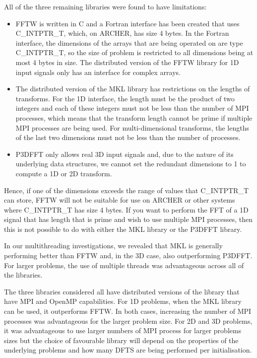 \documentclass[a4paper]{article}
\begin{document}
All of the three remaining libraries were found to have limitations:
\begin{itemize}
\item FFTW is written in C and a Fortran interface has been created
  that uses C\_INTPTR\_T, which, on ARCHER, has size 4 bytes. In the
  Fortran interface, the dimensions of the arrays that are being
  operated on are type C\_INTPTR\_T, so the size of problem is
  restricted to all dimensions being at most 4 bytes in size. The
  distributed version of the FFTW library for 1D input signals only
  has an interface for complex arrays.
 \item The distributed version of the MKL library has restrictions on
   the lengths of transforms. For the 1D interface, the length must be the
   product of two integers and each of these integers must not be less
   than the number of MPI processes, which means that the transform
   length cannot be prime if multiple MPI processes are being
   used. For multi-dimensional transforms, the lengths of the last two
   dimensions must not be less than the number of processes.
 \item P3DFFT only allows real 3D input signals and, due to the nature
   of its underlying data structures, we cannot set the redundant
   dimensions to 1 to compute a 1D or 2D transform.

\end{itemize}
Hence, if one of the dimensions exceeds the range of values that
C\_INTPTR\_T can store, FFTW will not be suitable for use on ARCHER or
other systems where C\_INTPTR\_T has size 4 bytes. If you want to
perform the FFT of a 1D signal that has length that is prime and wish
to use multiple MPI processes, then this is not possible to do with
either the MKL library or the P3DFFT library.

In our multithreading investigations, we revealed that MKL is
generally performing better than FFTW and, in the 3D case, also
outperforming P3DFFT. For larger problems, the use of multiple threads
was advantageous across all of the libraries.

The three libraries considered all have distributed versions of the
library that have MPI and OpenMP capabilities. For 1D problems, when
the MKL library can be used, it outperforms FFTW. In both cases,
increasing the number of MPI processes was advantageous for the larger
problem size. For 2D and 3D problems, it was advantageous to use
larger numbers of MPI process for larger problems sizes but the choice
of favourable library will depend on the properties of the underlying
problems and how many DFTS are being performed per initialisation.
\end{document}

